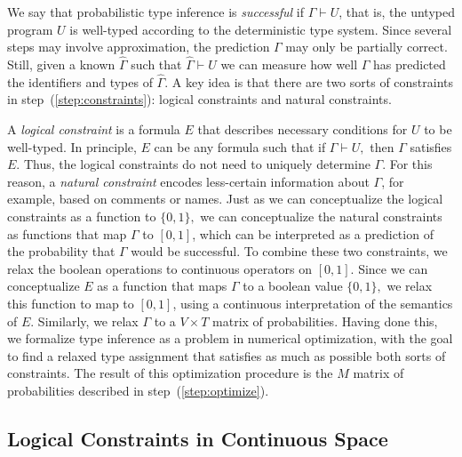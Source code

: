 \documentclass[sigplan,10pt,review,anonymous]{acmart} %
\theoremstyle{plain}
\theoremstyle{remark}
\theoremstyle{definition}
\begin{document}
We say that probabilistic type inference is \emph{successful} if $\Gamma \vdash U$, that is, the untyped program $U$ is well-typed according to the deterministic type system.
%
Since several steps may involve approximation, the prediction $\Gamma$ may only be partially correct.
%
Still, given a known $\hat{\Gamma}$ such that $\hat{\Gamma} \vdash U$ we can measure how well $\Gamma$ has predicted the identifiers and types of $\hat{\Gamma}$.
%
A key idea is that there are two sorts of constraints in step~(\ref{step:constraints}): logical constraints and natural
constraints.

A \emph{logical constraint} is a formula $E$ that describes
necessary conditions for $U$ to be well-typed.
In principle, $E$ can be any formula such that if $\Gamma \vdash U,$
then $\Gamma$ satisfies $E$.
Thus, the logical constraints
do not need to uniquely determine $\Gamma$.
For this reason, a \emph{natural constraint}
encodes less-certain information about $\Gamma$,
for example, based on comments or names.
Just as we can conceptualize the logical
constraints as a function to $\{0, 1\},$
we can conceptualize the natural constraints as functions
that map $\Gamma$ to $[0, 1]$, which can be interpreted
as a prediction of the probability that $\Gamma$ would
be successful. To combine these two constraints, we relax the boolean operations to continuous operators on $[0, 1]$.
Since we can conceptualize $E$ as a function
that maps $\Gamma$ to a boolean value $\{0, 1\},$
we relax this function to map to $[0,1]$, using
a continuous interpretation of the semantics of $E.$
Similarly, we relax $\Gamma$ to a $V \times T$ matrix of probabilities.
Having done this,
we formalize type inference as a problem in
numerical optimization, with the goal to find a relaxed type assignment
that satisfies as much as possible both sorts of constraints.
The result of this optimization procedure is the
$M$ matrix of probabilities described in step~(\ref{step:optimize}).

\subsection{Logical Constraints in Continuous Space}\label{ssec:logcon}
\end{document}
